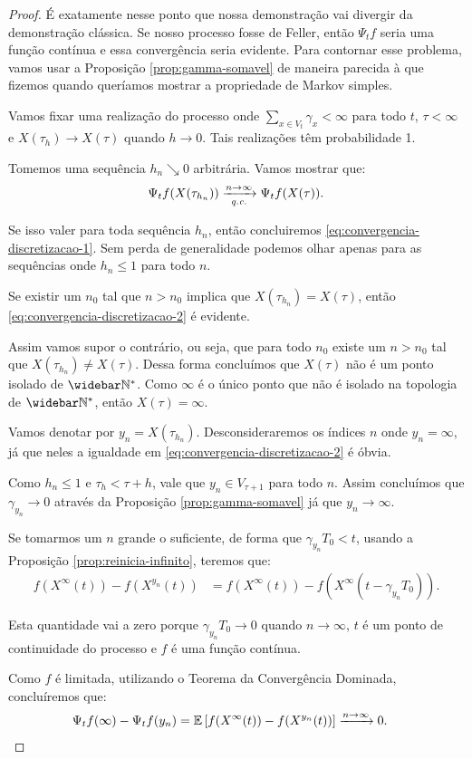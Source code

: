 \begin{proof}
  É exatamente nesse ponto que nossa demonstração vai divergir da
  demonstração clássica. Se nosso processo fosse de Feller, então
  $\Psi_t f$ seria uma função contínua e essa convergência seria
  evidente. Para contornar esse problema, vamos usar a Proposição
  \ref{prop:gamma-somavel} de maneira parecida à que fizemos quando
  queríamos mostrar a propriedade de Markov simples.

  Vamos fixar uma realização do processo onde $\sum_{x \in V_t}
  \gamma_x < \infty$ para todo $t$, $\tau < \infty$ e $X(\tau_{h}) \to
  X(\tau)$ quando $h \to 0$. Tais realizações têm probabilidade 1.


  Tomemos uma sequência $h_n \searrow 0$ arbitrária. Vamos mostrar que:
  \begin{equation}
    \label{eq:convergencia-discretizacao-2}
    \Psi_t f (X(\tau_{h_n})) \xrightarrow[{\emph{q.c.}}]{n \to \infty}
    \Psi_t f(X(\tau)).
  \end{equation}

  Se isso valer para toda sequência $h_n$, então concluiremos
  \eqref{eq:convergencia-discretizacao-1}. Sem perda de generalidade
  podemos olhar apenas para as sequências onde $h_n \leq 1$ para todo
  $n$.

  Se existir um $n_0$ tal que $n > n_0$ implica que $X(\tau_{h_n}) =
  X(\tau)$, então \eqref{eq:convergencia-discretizacao-2} é evidente.

  Assim vamos supor o contrário, ou seja, que para todo $n_0$ existe
  um $n > n_0$ tal que $X(\tau_{h_n}) \neq X(\tau)$. Dessa forma
  concluímos que $X(\tau)$ não é um ponto isolado de $\Nzb$. Como
  $\infty$ é o único ponto que não é isolado na topologia de $\Nzb$,
  então $X(\tau) = \infty$.

  Vamos denotar por $y_n = X(\tau_{h_n})$. Desconsideraremos os
  índices $n$ onde $y_n = \infty$, já que neles a igualdade em
  \eqref{eq:convergencia-discretizacao-2} é óbvia.

  Como $h_n \leq 1$ e $\tau_h < \tau + h$, vale que $y_n \in V_{\tau +
    1}$ para todo $n$.  Assim concluímos que $\gamma_{y_n} \to 0$
  através da Proposição \ref{prop:gamma-somavel} já que $y_n \to
  \infty$.

  Se tomarmos um $n$ grande o suficiente, de forma que $\gamma_{y_n}
  T_0 < t$, usando a Proposição \ref{prop:reinicia-infinito}, teremos
  que:
  \begin{align*}
    f(X^{\infty}(t)) - f(X^{y_n}(t)) &=
    f(X^{\infty}(t)) - f(X^{\infty}(t-\gamma_{y_n} T_0)).
  \end{align*}

  Esta quantidade vai a zero \qc porque $\gamma_{y_n} T_0 \to 0$
  \qc quando $n \to \infty$, $t$ é \qc um ponto de continuidade do
  processo e $f$ é uma função contínua.

  Como $f$ é limitada, utilizando o Teorema da Convergência Dominada,
  concluíremos que:
  \begin{align*}
    \Psi_t f(\infty) - \Psi_t f (y_n)
    &= {\mathbb{E}} \left[
      f(X^{\infty}(t)) - f(X^{y_n}(t))
    \right] \xrightarrow{n \to \infty} 0.
    \qedhere
  \end{align*}
\end{proof}



